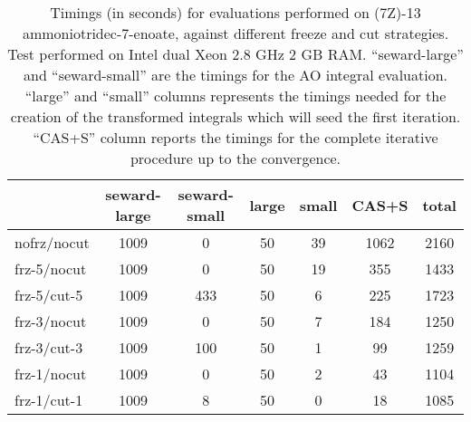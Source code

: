 \begin{center}
\begin{table}[ht]
\footnotesize
\begin{center}
\begin{tabular}{lcccccc}
\hline
				&	seward-large	&	seward-small		&	large	& small	&	CAS+S	&	total \\
\hline
nofrz/nocut		&	1009			&			0			&	50		&	39		&	1062	&	2160 \\
frz-5/nocut		&	1009			&			0			&	50		&	19		&	355		&	1433 \\
frz-5/cut-5		&	1009			&			433			&	50		&	6		&	225		&	1723 \\
frz-3/nocut		&	1009			&			0			&	50		&	7		&	184		&	1250 \\
frz-3/cut-3		&	1009			&			100			&	50		&	1		&	99		&	1259 \\
frz-1/nocut		&	1009			&			0			&	50		&	2		&	43		&	1104 \\
frz-1/cut-1		&	1009			&			8			&	50		&	0		&	18		&	1085 \\
\hline
\end{tabular}
\end{center}
\caption{\footnotesize Timings (in seconds) for evaluations performed on (7Z)-13
ammoniotridec-7-enoate, against different freeze and cut strategies. Test
performed on Intel dual Xeon 2.8 GHz 2 GB RAM. ``seward-large'' and ``seward-small''
are the timings for the AO integral evaluation. ``large'' and ``small'' columns
represents the timings needed for the creation of the transformed integrals
which will seed the first iteration. ``CAS+S'' column reports the timings for
the complete iterative procedure up to the convergence.}
\label{tbl:timings}
\end{table}
\end{center}
